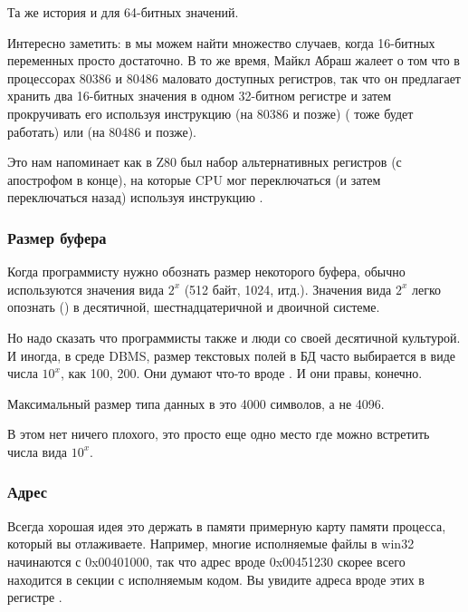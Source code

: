 Та же история и для 64-битных значений.


Интересно заметить: в 
мы можем найти множество случаев, когда 16-битных переменных просто достаточно.
В то же время, Майкл Абраш жалеет о том что в процессорах 80386 и 80486 маловато доступных регистров,
так что он предлагает хранить два 16-битных значения в одном 32-битном регистре и затем прокручивать его 
используя инструкцию  (на 80386 и позже) ( тоже будет работать) или
 (на 80486 и позже).

Это нам напоминает как в Z80 был набор альтернативных регистров (с апострофом в конце), на которые CPU мог переключаться
(и затем переключаться назад) используя инструкцию .

\subsubsection{Размер буфера}

Когда программисту нужно обознать размер некоторого буфера, обычно используются значения вида $2^x$ (512 байт, 1024, итд.).
Значения вида $2^x$ легко опознать () в десятичной, шестнадцатеричной и двоичной системе.

Но надо сказать что программисты также и люди со своей десятичной культурой.
И иногда, в среде \ac{DBMS}, размер текстовых полей в БД часто выбирается в виде числа $10^x$, как 100, 200.
Они думают что-то вроде .
И они правы, конечно.

Максимальный размер типа данных  в \oracle это 4000 символов, а не 4096.

В этом нет ничего плохого, это просто еще одно место где можно встретить числа вида $10^x$.

\subsubsection{Адрес}

Всегда хорошая идея это держать в памяти примерную карту памяти процесса, который вы отлаживаете.
Например, многие исполняемые файлы в win32 начинаются с 0x00401000, так что адрес вроде 0x00451230 скорее всего находится в секции с исполняемым кодом.
Вы увидите адреса вроде этих в регистре .

